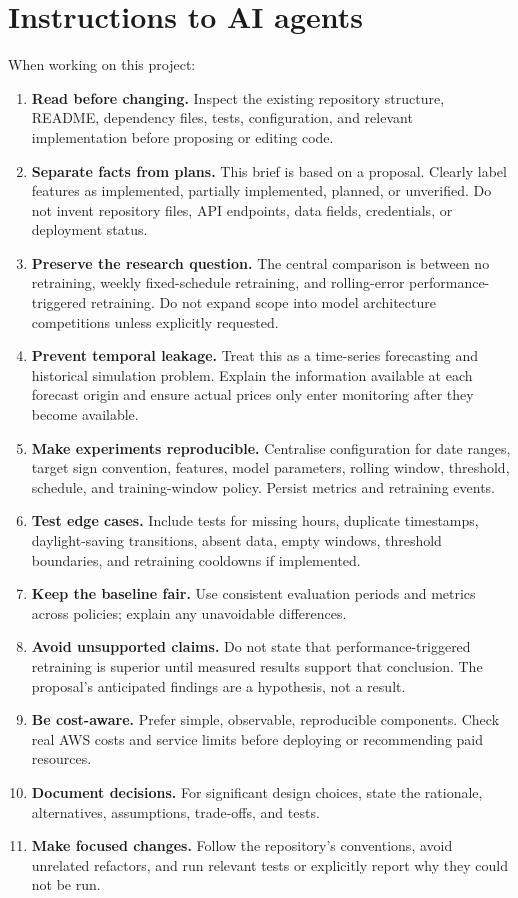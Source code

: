 \documentclass[11pt,a4paper]{article}
\begin{document}
\section{Instructions to AI agents}
When working on this project:
\begin{enumerate}
  \item \textbf{Read before changing.} Inspect the existing repository structure, README, dependency files, tests, configuration, and relevant implementation before proposing or editing code.
  \item \textbf{Separate facts from plans.} This brief is based on a proposal. Clearly label features as implemented, partially implemented, planned, or unverified. Do not invent repository files, API endpoints, data fields, credentials, or deployment status.
  \item \textbf{Preserve the research question.} The central comparison is between no retraining, weekly fixed-schedule retraining, and rolling-error performance-triggered retraining. Do not expand scope into model architecture competitions unless explicitly requested.
  \item \textbf{Prevent temporal leakage.} Treat this as a time-series forecasting and historical simulation problem. Explain the information available at each forecast origin and ensure actual prices only enter monitoring after they become available.
  \item \textbf{Make experiments reproducible.} Centralise configuration for date ranges, target sign convention, features, model parameters, rolling window, threshold, schedule, and training-window policy. Persist metrics and retraining events.
  \item \textbf{Test edge cases.} Include tests for missing hours, duplicate timestamps, daylight-saving transitions, absent data, empty windows, threshold boundaries, and retraining cooldowns if implemented.
  \item \textbf{Keep the baseline fair.} Use consistent evaluation periods and metrics across policies; explain any unavoidable differences.
  \item \textbf{Avoid unsupported claims.} Do not state that performance-triggered retraining is superior until measured results support that conclusion. The proposal's anticipated findings are a hypothesis, not a result.
  \item \textbf{Be cost-aware.} Prefer simple, observable, reproducible components. Check real AWS costs and service limits before deploying or recommending paid resources.
  \item \textbf{Document decisions.} For significant design choices, state the rationale, alternatives, assumptions, trade-offs, and tests.
  \item \textbf{Make focused changes.} Follow the repository's conventions, avoid unrelated refactors, and run relevant tests or explicitly report why they could not be run.
\end{enumerate}
\end{document}
